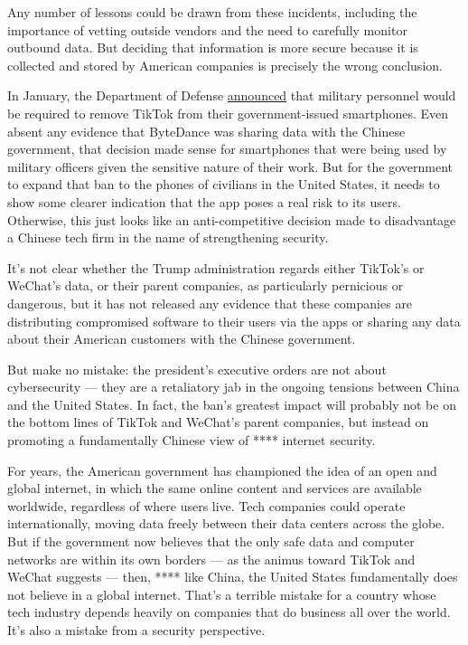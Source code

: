 Any number of lessons could be drawn from these incidents, including the
importance of vetting outside vendors and the need to carefully monitor
outbound data. But deciding that information is more secure because it
is collected and stored by American companies is precisely the wrong
conclusion.

In January, the Department of Defense
\href{https://www.nytimes.com/2020/01/04/us/tiktok-pentagon-military-ban.html}{announced}
that military personnel would be required to remove TikTok from their
government-issued smartphones. Even absent any evidence that ByteDance
was sharing data with the Chinese government, that decision made sense
for smartphones that were being used by military officers given the
sensitive nature of their work. But for the government to expand that
ban to the phones of civilians in the United States, it needs to show
some clearer indication that the app poses a real risk to its users.
Otherwise, this just looks like an anti-competitive decision made to
disadvantage a Chinese tech firm in the name of strengthening security.

It's not clear whether the Trump administration regards either TikTok's
or WeChat's data, or their parent companies, as particularly pernicious
or dangerous, but it has not released any evidence that these companies
are distributing compromised software to their users via the apps or
sharing any data about their American customers with the Chinese
government.

But make no mistake: the president's executive orders are not about
cybersecurity --- they are a retaliatory jab in the ongoing tensions
between China and the United States. In fact, the ban's greatest impact
will probably not be on the bottom lines of TikTok and WeChat's parent
companies, but instead on promoting a fundamentally Chinese view of ****
internet security.

For years, the American government has championed the idea of an open
and global internet, in which the same online content and services are
available worldwide, regardless of where users live. Tech companies
could operate internationally, moving data freely between their data
centers across the globe. But if the government now believes that the
only safe data and computer networks are within its own borders --- as
the animus toward TikTok and WeChat suggests --- then, **** like China,
the United States fundamentally does not believe in a global internet.
That's a terrible mistake for a country whose tech industry depends
heavily on companies that do business all over the world. It's also a
mistake from a security perspective.

